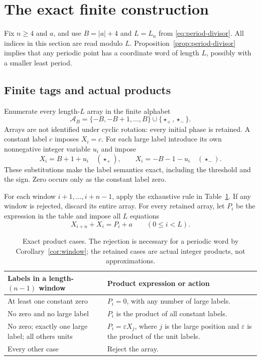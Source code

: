 \section{The exact finite construction}
\label{sec:atlas}

Fix $n\ge4$ and $a$, and use $B=|a|+4$ and $L=L_n$ from
\eqref{eq:period-divisor}. All indices in this section are read
modulo $L$. Proposition~\ref{prop:period-divisor} implies that any
periodic point has a coordinate word of length $L$, possibly with
a smaller least period.

\subsection{Finite tags and actual products}

Enumerate every length-$L$ array in the finite alphabet
\[
 \mathcal A_B=\{-B,-B+1,\ldots,B\}\cup\{\star_+,\star_-\}.
\]
Arrays are not identified under cyclic rotation: every initial
phase is retained. A constant label $c$ imposes $X_i=c$. For each
large label introduce its own nonnegative integer variable $u_i$
and impose
\begin{equation}
 X_i=B+1+u_i\quad(\star_+),\qquad
 X_i=-B-1-u_i\quad(\star_-).
 \label{eq:large-tags}
\end{equation}
These substitutions make the label semantics exact, including the
threshold and the sign. Zero occurs only as the constant label zero.

For each window $i+1,\ldots,i+n-1$, apply the exhaustive rule in
Table~\ref{tab:tags}. If any window is rejected, discard its entire
array. For every retained array, let $P_i$ be the expression in the
table and impose all $L$ equations
\begin{equation}
 X_{i+n}+X_i=P_i+a\qquad(0\le i<L).
 \label{eq:linear-recurrence}
\end{equation}

\begin{table}[ht]
\centering\small
\begin{tabular}{@{}p{}p{}@{}}
\toprule
Labels in a length-$(n-1)$ window & Product expression or action\\
\midrule
At least one constant zero & $P_i=0$, with any number of large labels.\\
No zero and no large label & $P_i$ is the product of all constant labels.\\
No zero; exactly one large label; all others units &
$P_i=\varepsilon X_j$, where $j$ is the large position and
$\varepsilon$ is the product of the unit labels.\\
Every other case & Reject the array.\\
\bottomrule
\end{tabular}
\caption{Exact product cases. The rejection is necessary for a
periodic word by Corollary~\ref{cor:window}; the retained cases are
actual integer products, not approximations.}
\label{tab:tags}
\end{table}


